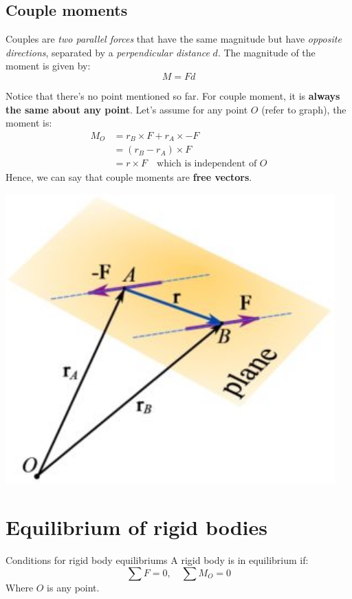 \documentclass{article}
\begin{document}
\subsection{Couple moments}
Couples are \emph{two parallel forces} that have the same magnitude but have \emph{opposite directions}, separated by a \emph{perpendicular distance} $d$. The magnitude of the moment is given by:
\[M=Fd\]

\begin{minipage}{0.65\textwidth}
    Notice that there's no point mentioned so far. For couple moment, it is \textbf{always the same about any point}. Let's assume for any point $O$ (refer to graph), the moment is:
    \begin{align*}
        M_O & =r_B\times F+r_A\times -F \\&=(r_B-r_A)\times F\\&=r\times F\quad\text{which is independent of }O
    \end{align*}
    Hence, we can say that couple moments are \textbf{free vectors}.
\end{minipage}
\hfill
\begin{minipage}{0.3\textwidth}
    \includegraphics[width=0.95\textwidth]{img/Couple.jpg}
\end{minipage}

\section{Equilibrium of rigid bodies}
\begin{definition}
    {Conditions for rigid body equilibriums}
    A rigid body is in equilibrium if:
    \[\sum F=0,\quad\sum M_O=0\]
    Where $O$ is any point.
\end{definition}
\end{document}

